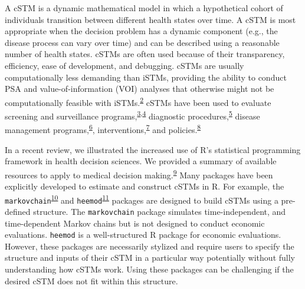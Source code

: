 \documentclass[
]{article}
\begin{document}
A cSTM is a dynamic mathematical model in which a hypothetical cohort of individuals transition between different health states over time. A cSTM is most appropriate when the decision problem has a dynamic component (e.g., the disease process can vary over time) and can be described using a reasonable number of health states. cSTMs are often used because of their transparency, efficiency, ease of development, and debugging. cSTMs are usually computationally less demanding than iSTMs, providing the ability to conduct PSA and value-of-information (VOI) analyses that otherwise might not be computationally feasible with iSTMs.\textsuperscript{\protect\hyperlink{ref-Siebert2012c}{2}} cSTMs have been used to evaluate screening and surveillance programs,\textsuperscript{\protect\hyperlink{ref-Suijkerbuijk2018}{3},\protect\hyperlink{ref-Sathianathen2018a}{4}} diagnostic procedures,\textsuperscript{\protect\hyperlink{ref-Lu2018b}{5}} disease management programs,\textsuperscript{\protect\hyperlink{ref-Djatche2018}{6}}, interventions,\textsuperscript{\protect\hyperlink{ref-Smith-Spangler2010}{7}} and policies.\textsuperscript{\protect\hyperlink{ref-Pershing2014}{8}}

In a recent review, we illustrated the increased use of R's statistical programming framework in health decision sciences. We provided a summary of available resources to apply to medical decision making.\textsuperscript{\protect\hyperlink{ref-Jalal2017b}{9}} Many packages have been explicitly developed to estimate and construct cSTMs in R. For example, the \texttt{markovchain}\textsuperscript{\protect\hyperlink{ref-Spedicato2017}{10}} and \texttt{heemod}\textsuperscript{\protect\hyperlink{ref-Filipovic-Pierucci2017}{11}} packages are designed to build cSTMs using a pre-defined structure. The \texttt{markovchain} package simulates time-independent, and time-dependent Markov chains but is not designed to conduct economic evaluations. \texttt{heemod} is a well-structured R package for economic evaluations. However, these packages are necessarily stylized and require users to specify the structure and inputs of their cSTM in a particular way potentially without fully understanding how cSTMs work. Using these packages can be challenging if the desired cSTM does not fit within this structure.
\end{document}
